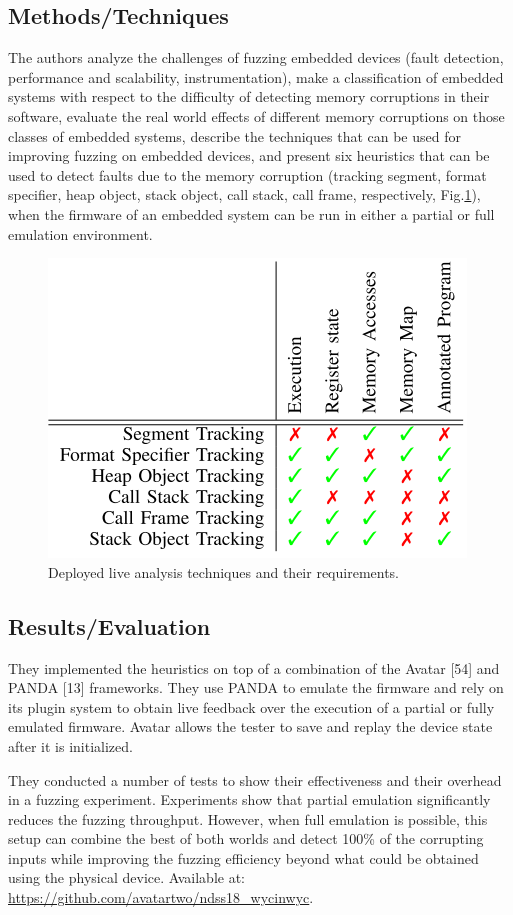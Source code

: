 \subsection{Methods/Techniques}
The authors analyze the challenges of fuzzing embedded devices (fault detection, performance and scalability, instrumentation), make a classification of embedded systems with respect to the difficulty of detecting memory corruptions in their software, evaluate the real world effects of different memory corruptions on those classes of embedded systems, describe the techniques that can be used for improving fuzzing on embedded devices, and present six heuristics that can be used to detect faults due to the memory corruption (tracking segment, format specifier, heap object, stack object, call stack, call frame, respectively, Fig.\ref{fig:liveanalysis}), when the firmware of an embedded system can be run in either a partial or full emulation environment.
\begin{figure}[h]
    \centering
    \includegraphics[width=0.6\linewidth]{liveanalysis.png} %
    \caption{Deployed live analysis techniques and their requirements.}	
    \label{fig:liveanalysis}
\end{figure}
\subsection{Results/Evaluation}
They implemented the heuristics on top of a combination of the Avatar [54] and PANDA [13] frameworks. They use PANDA to emulate the firmware and rely on its plugin system to obtain live feedback over the execution of a partial or fully emulated firmware. Avatar allows the tester to save and replay the device state after it is initialized. 

They conducted a number of tests to show their effectiveness and their overhead in a fuzzing experiment. Experiments show that partial emulation significantly reduces the fuzzing throughput. However, when full emulation is possible, this setup can combine the best of both worlds and detect 100\% of the corrupting inputs while improving the fuzzing efficiency beyond what could be obtained using the physical device. Available at: \url{https://github.com/avatartwo/ndss18_wycinwyc}.
